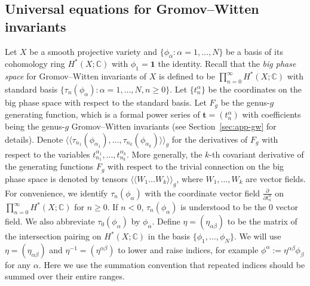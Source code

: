 \documentclass[12pt,reqno]{amsart}
\theoremstyle{plain}
\theoremstyle{definition}
\theoremstyle{remark}
\begin{document}
\subsection{Universal equations for Gromov--Witten invariants}Let $X$ be a smooth projective variety and $\{\phi_\alpha: \alpha=1,\dots,N\}$ be a basis of its cohomology ring $H^*(X;\mathbb{C})$ with $\phi_1=\mathbf{1}$ the identity.
Recall that the \emph{big phase space} for Gromov--Witten invariants of $X$ is defined to be $\prod_{n=0}^{\infty}H^*(X;\mathbb{C})$ with standard
basis $\{\tau_{n}(\phi_\alpha): \alpha=1,\dots,N, n\geq0\}$. Let $\{t_n^\alpha\}$ be 
 the coordinates on the big phase space
with respect to the standard basis.
Let $F_g$ be the genus-$g$ generating function, which is a formal power
series of $\mathbf{t}=(t_n^\alpha)$  with coefficients being the  genus-$g$ Gromov--Witten invariants (see Section~\ref{sec:app-gw} for details).
Denote $\langle\langle\tau_{n_1}(\phi_{\alpha_1}),\dots,\tau_{n_k}(\phi_{\alpha_k})\rangle\rangle_g$ for the derivatives
of $F_g$ with respect to the variables $t_{n_1}^{\alpha_1},\dots,t_{n_k}^{\alpha_k}$.  More generally, the $k$-th covariant derivative of the generating functions $F_g$  with respect to the trivial connection on the big phase space
is denoted by tensors $\langle\langle W_1\ldots W_k\rangle\rangle_{g}$, where $W_1, \dots, W_k$ are vector fields.
For convenience, we identify $\tau_n(\phi_\alpha)$ with
the coordinate vector field $\frac{\partial}{\partial t_n^\alpha}$
on $\prod_{n=0}^{\infty}H^*(X;\mathbb{C})$ for $n\geq0$. If $n<0$, $\tau_n(\phi_\alpha)$ is understood to be the $0$
vector field. We also abbreviate $\tau_0(\phi_\alpha)$ by $\phi_\alpha$. Define $\eta=(\eta_{\alpha\beta})$ to be the matrix of the intersection pairing on $H^{*}(X;\mathbb{C})$  in the basis $\{\phi_{1},\dots,\phi_{N}\}$. We will use
$\eta=(\eta_{\alpha\beta})$ and $\eta^{-1}=(\eta^{\alpha\beta})$ to lower and  raise indices, for example $\phi^{\alpha}:=\eta^{\alpha\beta}\phi_{\beta}$ for any $\alpha$.
Here we use the summation convention that repeated indices should be summed over their entire ranges.
\end{document}
